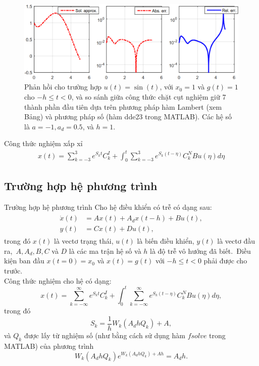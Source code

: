 \documentclass[10pt,notheorems]{beamer}
\theoremstyle{definition}
\theoremstyle{definition}
\theoremstyle{definition}
\begin{document}
\begin{frame}
	\begin{figure}[ht]
	\begin{center}
		\includegraphics[scale=0.4]{hinh/hinh2}
	\end{center}
	\caption{Phản hồi cho trường hợp $u(t)=\sin(t)$, với $x_0=1$ và $g(t)=1$ cho $-h\leq t<0$, và so sánh giữa công thức chặt cụt nghiệm giữ 7 thành phần đầu tiên dựa trên phương pháp hàm Lambert (xem Bảng) và phương pháp số (hàm dde23 trong MATLAB). Các hệ số là $a=-1, a_d=0.5$, và $h=1$.}
	\label{refhinh2}
\end{figure}

Công thức nghiệm xấp xỉ
\begin{align*}
x(t) = \sum\limits^3_{k=-3}e^{S_kt}C^I_k+\int^t_0\sum\limits^3_{k=-3}e^{S_k(t-\eta)}C^N_kBu(\eta)d\eta
\end{align*}
%
\end{frame}


\subsection{Trường hợp hệ phương trình}

\begin{frame}{Trường hợp hệ phương trình}
Cho hệ điều khiển có trễ có dạng sau:
\begin{align*}\label{13}
\begin{split}
\dot{x}(t)&=Ax(t)+A_dx(t-h)+Bu(t), \\
y(t)&=Cx(t)+Du(t),
\end{split}
\end{align*}\pause
trong đó $x(t)$ là vectơ trạng thái, $u(t)$ là biến điều khiển, $y(t)$ là vectơ đầu ra,\ \pause $A, A_d, B, C$ và $D$ là các ma trận hệ số và $h$ là độ trễ vô hướng đã biết.\ \pause Điều kiện ban đầu $x(t=0)=x_0$ và $x(t)=g(t)$ với $-h\leq t <0$ phải được cho trước. \\ \pause
Công thức nghiệm cho hệ có dạng:
%
\begin{equation*}\label{14}
x(t) = \sum\limits^\infty_{k=-\infty}e^{S_kt}C^I_k+\int^t_0\sum\limits^\infty_{k=-\infty}e^{S_k(t-\eta)}C^N_kBu(\eta)d\eta,
\end{equation*} \pause
trong đó
\begin{equation*}\label{15}
S_k=\dfrac{1}{h}W_k(A_dhQ_k)+A,
\end{equation*} \pause
và $Q_k$ được lấy từ nghiệm số (như bằng cách sử dụng hàm $fsolve$ trong MATLAB) của phương trình
%
\begin{equation*}\label{16}
W_k(A_dhQ_k)e^{W_k(A_dhQ_k)+Ah}=A_dh.
\end{equation*} 
\end{frame}
\end{document}
